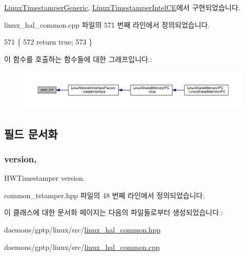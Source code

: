 \hyperlink{class_linux_timestamper_generic_aeada5965d363813719d4b3e0c6ba209e}{Linux\+Timestamper\+Generic}, \hyperlink{class_linux_timestamper_intel_c_e_aeada5965d363813719d4b3e0c6ba209e}{Linux\+Timestamper\+Intel\+CE}에서 구현되었습니다.



linux\+\_\+hal\+\_\+common.\+cpp 파일의 571 번째 라인에서 정의되었습니다.


\begin{DoxyCode}
571                                                                            \{
572     \textcolor{keywordflow}{return} \textcolor{keyword}{true};
573 \}
\end{DoxyCode}


이 함수를 호출하는 함수들에 대한 그래프입니다.\+:
\nopagebreak
\begin{figure}[H]
\begin{center}
\leavevmode
\includegraphics[width=350pt]{class_linux_timestamper_ac2055edb1eebef8381ef57e01f55d3e0_icgraph}
\end{center}
\end{figure}




\subsection{필드 문서화}
\subsubsection[{\texorpdfstring{version}{version}}]{ version\hspace{0.3cm}{\ttfamily [protected]}, {\ttfamily [inherited]}}\hypertarget{class_common_timestamper_ab22abc2906422da61885ac6c8e6a1a59}{}\label{class_common_timestamper_ab22abc2906422da61885ac6c8e6a1a59}


H\+W\+Timestamper version. 



common\+\_\+tstamper.\+hpp 파일의 48 번째 라인에서 정의되었습니다.



이 클래스에 대한 문서화 페이지는 다음의 파일들로부터 생성되었습니다.\+:\begin{DoxyCompactItemize}
\item 
daemons/gptp/linux/src/\hyperlink{linux__hal__common_8hpp}{linux\+\_\+hal\+\_\+common.\+hpp}\item 
daemons/gptp/linux/src/\hyperlink{linux__hal__common_8cpp}{linux\+\_\+hal\+\_\+common.\+cpp}\end{DoxyCompactItemize}
